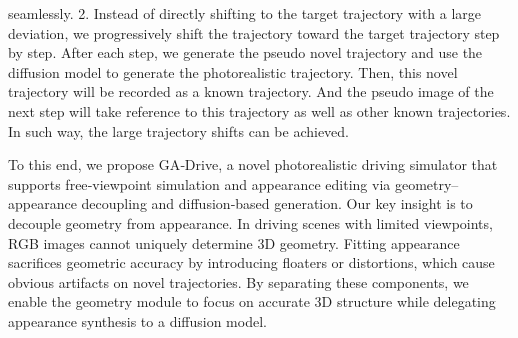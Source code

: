 seamlessly. 2. Instead of directly shifting to the target trajectory with a large deviation, we progressively shift the trajectory toward the target trajectory step by step. After each step, we generate the pseudo novel trajectory and use the diffusion model to generate the photorealistic trajectory. Then, this novel trajectory will be recorded as a known trajectory. And the pseudo image of the next step will take reference to this trajectory as well as other known trajectories. In such way, the large trajectory shifts can be achieved. 


To this end, we propose GA‑Drive, a novel photorealistic driving simulator that supports free‑viewpoint simulation and appearance editing via geometry–appearance decoupling and diffusion‑based generation.
Our key insight is to decouple geometry from appearance. In driving scenes with limited viewpoints, RGB images cannot uniquely determine 3D geometry. Fitting appearance sacrifices geometric accuracy by introducing floaters or distortions, which cause obvious artifacts on novel trajectories. By separating these components, we enable the geometry module to focus on accurate 3D structure while delegating appearance synthesis to a diffusion model.



